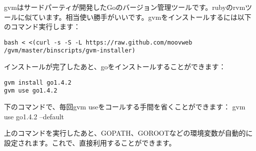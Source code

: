 gvmはサードパーティが開発したGoのバージョン管理ツールです。rubyのrvmツールに似ています。相当使い勝手がいいです。gvmをインストールするには以下のコマンド実行します：

\begin{lstlisting}[numbers=none]
bash < <(curl -s -S -L https://raw.github.com/moovweb
/gvm/master/binscripts/gvm-installer)
\end{lstlisting}

インストールが完了したあと、goをインストールすることができます：

\begin{lstlisting}[numbers=none]
gvm install go1.4.2
gvm use go1.4.2
\end{lstlisting}

下のコマンドで、毎回gvm useをコールする手間を省くことができます： gvm use go1.4.2 --default

上のコマンドを実行したあと、GOPATH、GOROOTなどの環境変数が自動的に設定されます。これで、直接利用することができます。
